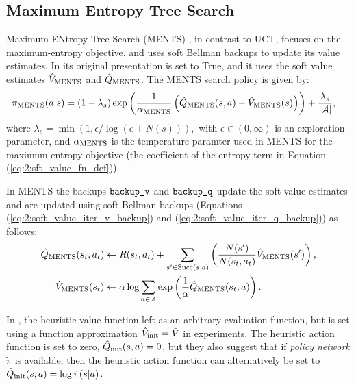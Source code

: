     \subsection{Maximum Entropy Tree Search}
    \label{sec:2-4-3-ments}

        Maximum ENtropy Tree Search (MENTS) \cite{ments}, in contrast to UCT, focuses on the maximum-entropy objective, and uses soft Bellman backups to update its value estimates. In its original presentation \mctsmode\ewe is set to True, and it uses the soft value estimates ${\hat{V}_{{\textnormal{MENTS}}}}$ and ${\hat{Q}_{{\textnormal{MENTS}}}}$. The MENTS search policy is given by:
        \begin{align}
            {\pi_{{\textnormal{MENTS}}}}(a|s) &= 
                (1-\lambda_s)\exp\left(\frac{1}{\alpha_{{\textnormal{MENTS}}}}\left({\hat{Q}_{{\textnormal{MENTS}}}}(s,a)-{\hat{V}_{{\textnormal{MENTS}}}}(s)\right)\right) 
                    + \frac{\lambda_s}{|\mathcal{A}|}, \label{eq:2:ments_policy}
        \end{align}
        where $\lambda_s=\min(1,\epsilon/\log(e+N(s))),$ with $\epsilon \in (0,\infty)$ is an exploration parameter, and $\alpha_{{\textnormal{MENTS}}}$ is the temperature paramter used in MENTS for the maximum entropy objective (the coefficient of the entropy term in Equation (\ref{eq:2:sft_value_fn_def})).

        In MENTS the backups ${\textnormal{\texttt{backup\_v}}}$ and ${\textnormal{\texttt{backup\_q}}}$ update the soft value estimates and are updated using soft Bellman backups (Equations (\ref{eq:2:soft_value_iter_v_backup}) and (\ref{eq:2:soft_value_iter_q_backup})) as follows:
        \begin{align}
            {\hat{Q}_{{\textnormal{MENTS}}}}(s_t,a_t) &\leftarrow 
                R(s_t,a_t) + \sum_{s'\in{\textnormal{Succ}(s,a)}} \left( \frac{N(s')}{N(s_t,a_t)} {\hat{V}_{{\textnormal{MENTS}}}}(s') \right), \label{eq:2:ments_backup_q} \\
            {\hat{V}_{{\textnormal{MENTS}}}}(s_t) &\leftarrow 
                \alpha \log \sum_{a\in\mathcal{A}} \exp \left(\frac{1}{\alpha}{\hat{Q}_{{\textnormal{MENTS}}}}(s_t,a) \right). \label{eq:2:ments_backup_v} 
        \end{align}

        In \cite{ments}, the heuristic value function left as an arbitrary evaluation function, but is set using a function approximation ${\hat{V}_{\textnormal{init}}}=\tilde{V}$ in experiments. The heuristic action function is set to zero, ${\hat{Q}_{\textnormal{init}}}(s,a)=0$, but they also suggest that if \textit{policy network} $\tilde{\pi}$ is available, then the heuristic action function can alternatively be set to ${\hat{Q}_{\textnormal{init}}}(s,a)=\log \tilde{\pi}(s|a)$. 















